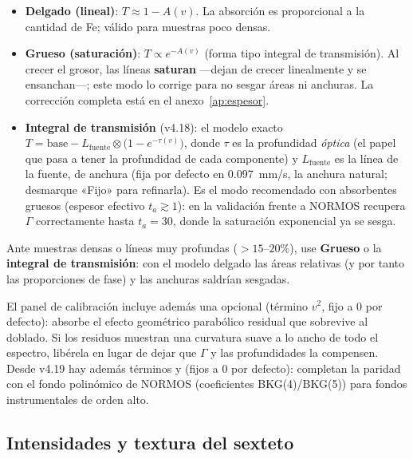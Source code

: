 \begin{itemize}[nosep]
  \item \textbf{Delgado (lineal)}: $T \approx 1 - A(v)$. La absorción es
        proporcional a la cantidad de Fe; válido para muestras poco densas.
  \item \textbf{Grueso (saturación)}: $T \propto e^{-A(v)}$ (forma tipo integral
        de transmisión). Al crecer el grosor, las líneas \textbf{saturan} —dejan
        de crecer linealmente y se ensanchan—; este modo lo corrige para no
        sesgar áreas ni anchuras. La corrección completa está en el
        anexo~\ref{ap:espesor}.
  \item \textbf{Integral de transmisión} (v4.18): el modelo exacto
        $T = \text{base} - L_{\text{fuente}} \otimes \bigl(1 - e^{-\tau(v)}\bigr)$,
        donde $\tau$ es la profundidad \emph{óptica} (el papel que pasa a tener
        la profundidad de cada componente) y $L_{\text{fuente}}$ es la línea de
        la fuente, de anchura  (fija por defecto en
        0.097~mm/s, la anchura natural; desmarque «Fijo» para refinarla). Es el
        modo recomendado con absorbentes gruesos (espesor efectivo
        $t_a \gtrsim 1$): en la validación frente a NORMOS recupera $\Gamma$
        correctamente hasta $t_a = 30$, donde la saturación exponencial ya se
        sesga.
\end{itemize}

\begin{truco}
Ante muestras densas o líneas muy profundas ($>15$--$20\%$), use \textbf{Grueso}
o la \textbf{integral de transmisión}: con el modelo delgado las áreas relativas
(y por tanto las proporciones de fase) y las anchuras saldrían sesgadas.
\end{truco}

El panel de calibración incluye además una  opcional
(término $v^2$, fijo a 0 por defecto): absorbe el efecto geométrico parabólico
residual que sobrevive al doblado. Si los residuos muestran una curvatura suave
a lo ancho de todo el espectro, libérela en lugar de dejar que $\Gamma$ y las
profundidades la compensen. Desde v4.19 hay además términos  y
 (fijos a 0 por defecto): completan la paridad con el fondo
polinómico de NORMOS (coeficientes BKG(4)/BKG(5)) para fondos instrumentales de
orden alto.

\subsection{Intensidades y textura del sexteto}
\label{sec:textura}

